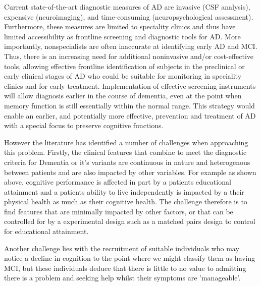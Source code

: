 Current state-of-the-art diagnostic measures of AD are invasive (CSF analysis), expensive (neuroimaging), and time-consuming (neuropsychological assessment). Furthermore, these measures are limited to speciality clinics and thus have limited accessibility as frontline screening and diagnostic tools for AD. More importantly, nonspecialists are often inaccurate at identifying early AD and MCI. Thus, there is an increasing need for additional noninvasive and/or cost-effective tools, allowing effective frontline identification of subjects in the preclinical or early clinical stages of AD who could be suitable for monitoring in speciality clinics and for early treatment. Implementation of effective screening instruments will allow diagnosis earlier in the course of dementia, even at the point when memory function is still essentially within the normal range. This strategy would enable an earlier, and potentially more effective, prevention and treatment of AD with a special focus to preserve cognitive functions.
\par 
However the literature has identified a number of challenges when approaching this problem. Firstly, the clinical features that combine to meet the diagnostic criteria for Dementia or it's variants are continuous in nature and heterogenous between patients and are also impacted by other variables. For example as shown above, cognitive performance is affected in part by a patients educational attainment and a patients ability to live independently is impacted by a their physical health as much as their cognitive health. The challenge therefore is to find features that are minimally impacted by other factors, or that can be controlled for by a experimental design such as a matched pairs design to control for educational attainment.
\par 
Another challenge lies with the recruitment of suitable individuals who may notice a decline in cognition to the point where we might classify them as having MCI, but these individuals deduce that there is little to no value to admitting there is a problem and seeking help whilst their symptoms are 'manageable'.
\par
